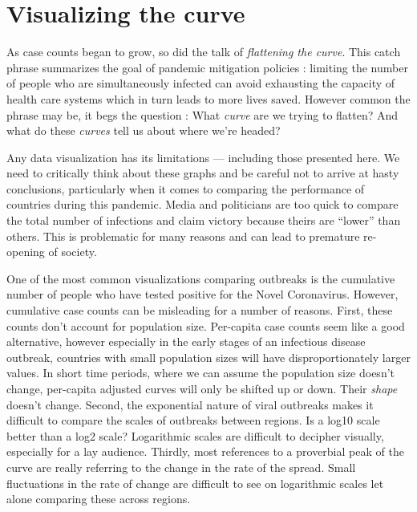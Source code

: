 \documentclass[alpha-refs]{wiley-article}
\begin{document}
\section{Visualizing the curve}

As case counts began to grow, so did the talk of \textit{flattening the curve}.
This catch phrase summarizes the goal of pandemic mitigation policies : limiting the number of people who are simultaneously infected can avoid exhausting the capacity of health care systems which in turn leads to more lives saved.
However common the phrase may be, it begs the question : What \textit{curve} are we trying to flatten? And what do these \textit{curves} tell us about where we're headed?

Any data visualization has its limitations --- including those presented here. 
We need to critically think about these graphs and be careful not to arrive at hasty conclusions, particularly when it comes to comparing the performance of countries during this pandemic. 
Media and politicians are too quick to compare the total number of infections and claim victory because theirs are ``lower'' than others. This is problematic for many reasons and can lead to premature re-opening of society.


One of the most common visualizations comparing outbreaks is the cumulative number of people who have tested positive for the Novel Coronavirus.
However, cumulative case counts can be misleading for a number of reasons.
First, these counts don't account for population size. 
Per-capita case counts seem like a good alternative, however especially in the early stages of an infectious disease outbreak, countries with small population sizes will have disproportionately larger values. In short time periods, where we can assume the population size doesn't change, per-capita adjusted curves will only be shifted up or down. Their \textit{shape} doesn't change.
Second, the exponential nature of viral outbreaks makes it difficult to compare the scales of outbreaks between regions.
Is a log10 scale better than a log2 scale?
Logarithmic scales are difficult to decipher visually, especially for a lay audience.
Thirdly, most references to a proverbial peak of the curve are really referring to the change in the rate of the spread.
Small fluctuations in the rate of change are difficult to see on logarithmic scales let alone comparing these across regions.
\end{document}

